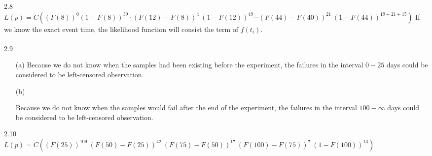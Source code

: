 \documentclass[paper=a4, fontsize=11pt]{scrartcl} %
\numberwithin{equation}{section} %
\numberwithin{figure}{section} %
\numberwithin{table}{section} %
\begin{document}
2.8\\
\qquad 
$
	L(p) =  	C\left( (F(8))^0 (1-F(8))^{39}\cdot (F(12)-F(8))^4\ (1-F(12))^{49}\cdots 
			(F(44)-F(40))^{21} \ (1-F(44))^{19+21+15}\right)
$
If we know the exact event time, the likelihood function will consist the term of $f(t_i)$. \\ \ \\
2.9
\begin{itemize}
	\item[(a)]{
		Because we do not know when the samples had been existing before the experiment, the failures in the interval $0-25$ days could be considered to be left-censored observation.
	}
	
	\item[(b)]{
		Because we do not know when the samples would fail after the end of the experiment, the failures in the interval $100-\infty$ days could be considered to be left-censored observation.

	}
\end{itemize}
2.10\\
$
	L(p) =  	C\left( (F(25))^{109}\  (F(50)-F(25))^{42}\ (F(75)-F(50))^{17}\ (F(100)-F(75))^{7} \ 
			(1-F(100))^{13} \right)
$

\end{document}
